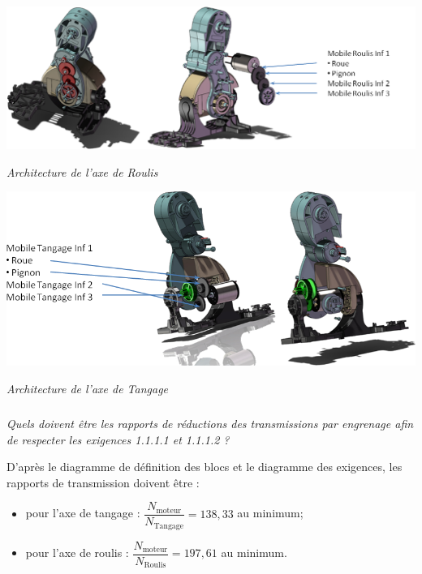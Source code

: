 \documentclass[10pt,fleqn]{article} %
\begin{document}
\begin{multicols}{2}
\begin{center}
\includegraphics[width=\linewidth]{images/Roulis}

\textit{Architecture de l'axe de Roulis}
\end{center}
\begin{center}
\includegraphics[width=\linewidth]{images/Tangage}

\textit{Architecture de l'axe de Tangage}
\end{center}


\fi

\subparagraph{}
\textit{Quels doivent être les rapports de réductions des transmissions par engrenage afin de respecter les exigences 1.1.1.1 et 1.1.1.2 ?}
\ifprof
\begin{corrige}
D'après le diagramme de définition des blocs et le diagramme des exigences, les rapports de transmission doivent être : 
\begin{itemize}
\item pour l'axe de tangage : $\dfrac{N_{\text{moteur}}}{N_{\text{Tangage}}}=138,33$ au minimum; 
\item pour l'axe de roulis :  $\dfrac{N_{\text{moteur}}}{N_{\text{Roulis}}}= 197,61$ au minimum.
\end{itemize}
\end{corrige}
\else
\fi



\end{multicols}
\end{document}
